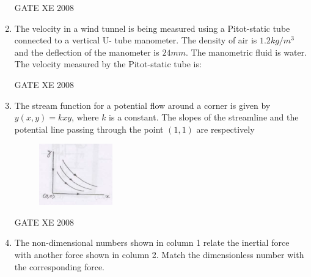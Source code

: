 \documentclass[12pt]{article}
\begin{document}
\begin{enumerate}[label=Q\arabic*.]
GATE XE 2008
\item The velocity in a wind tunnel is being measured using a Pitot-static tube connected to a vertical U- tube manometer. The density of air is $1.2 kg/m^3$ and the deflection of the manometer is $24 mm$. The manometric fluid is water. The velocity measured by the Pitot-static tube is:

\begin{enumerate}[label=(\Alph*)]
\end{enumerate}


GATE XE 2008
\item  The stream function for a potential flow around a corner is given by $y(x, y) = kxy$, where $k$ is a constant. The slopes of the streamline and the potential line passing through the point $(1,1)$ are respectively

\begin{figure}[H]
\centering
  \includegraphics[width=0.3\textwidth]{figs/ass1_d_q12.png}
  \caption{}
\end{figure} 

\begin{enumerate}[label=(\Alph*)]
\end{enumerate}

GATE XE 2008
\item The non-dimensional numbers shown in column 1 relate the inertial force with another force shown in column 2. Match the dimensionless number with the corresponding force.


\end{enumerate}
\end{document}
